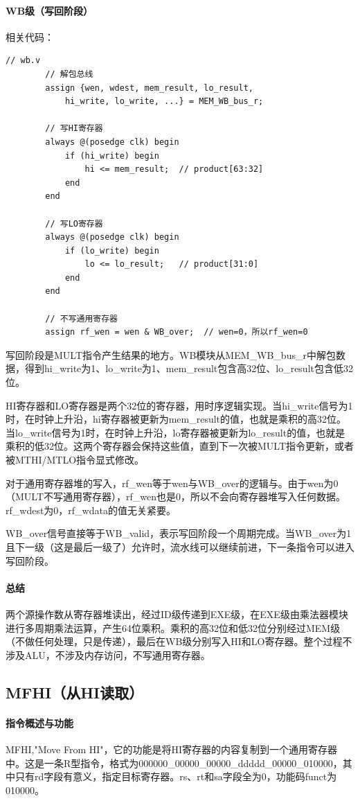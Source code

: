 \documentclass[a4paper]{article}
\begin{document}
	\paragraph{WB级（写回阶段）}
	相关代码：
	\begin{lstlisting}[caption={WB}]
		// wb.v
		// 解包总线
		assign {wen, wdest, mem_result, lo_result,
			hi_write, lo_write, ...} = MEM_WB_bus_r;
		
		// 写HI寄存器
		always @(posedge clk) begin
			if (hi_write) begin
				hi <= mem_result;  // product[63:32]
			end
		end
		
		// 写LO寄存器
		always @(posedge clk) begin
			if (lo_write) begin
				lo <= lo_result;   // product[31:0]
			end
		end
		
		// 不写通用寄存器
		assign rf_wen = wen & WB_over;  // wen=0，所以rf_wen=0
	\end{lstlisting}
	
	写回阶段是MULT指令产生结果的地方。WB模块从MEM\_WB\_bus\_r中解包数据，得到hi\_write为1、lo\_write为1、mem\_result包含高32位、lo\_result包含低32位。
	
	HI寄存器和LO寄存器是两个32位的寄存器，用时序逻辑实现。当hi\_write信号为1时，在时钟上升沿，hi寄存器被更新为mem\_result的值，也就是乘积的高32位。当lo\_write信号为1时，在时钟上升沿，lo寄存器被更新为lo\_result的值，也就是乘积的低32位。这两个寄存器会保持这些值，直到下一次被MULT指令更新，或者被MTHI/MTLO指令显式修改。
	
	对于通用寄存器堆的写入，rf\_wen等于wen与WB\_over的逻辑与。由于wen为0（MULT不写通用寄存器），rf\_wen也是0，所以不会向寄存器堆写入任何数据。rf\_wdest为0，rf\_wdata的值无关紧要。
	
	WB\_over信号直接等于WB\_valid，表示写回阶段一个周期完成。当WB\_over为1且下一级（这是最后一级了）允许时，流水线可以继续前进，下一条指令可以进入写回阶段。
	\paragraph{总结}
	两个源操作数从寄存器堆读出，经过ID级传递到EXE级，在EXE级由乘法器模块进行多周期乘法运算，产生64位乘积。乘积的高32位和低32位分别经过MEM级（不做任何处理，只是传递），最后在WB级分别写入HI和LO寄存器。整个过程不涉及ALU，不涉及内存访问，不写通用寄存器。
	
	\subsection{MFHI（从HI读取）}
	\paragraph{指令概述与功能}
	MFHI,"Move From HI"，它的功能是将HI寄存器的内容复制到一个通用寄存器中。这是一条R型指令，格式为000000\_00000\_00000\_ddddd\_00000\_010000，其中只有rd字段有意义，指定目标寄存器。rs、rt和sa字段全为0，功能码funct为010000。
	
\end{document}

